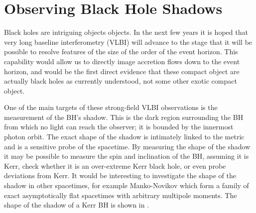 \section{Observing Black Hole Shadows}

Black holes are intriguing objects objects. In the next few years it is hoped that very long baseline interferometry (VLBI) will advance to the stage that it will be possible to resolve features of the size of the order of the event horizon\cite{Doeleman2008}. This capability would allow us to directly image accretion flows down to the event horizon, and would be the first direct evidence that these compact object are actually black holes as currently understood, not some other exotic compact object.

One of the main targets of these strong-field VLBI observations is the measurement of the BH's shadow. This is the dark region surrounding the BH from which no light can reach the observer; it is bounded by the innermost photon orbit\cite{Chandrasekhar1998}. The exact shape of the shadow is intimately linked to the metric and is a sensitive probe of the spacetime. By measuring the shape of the shadow it may be possible to measure the spin and inclination of the BH\cite{Hioki2009a}, assuming it is Kerr, check whether it is an over-extreme Kerr black hole\cite{Bambi2009}, or even probe deviations from Kerr\cite{Johannsen2010a, Johannsen2010b}. It would be interesting to investigate the shape of the shadow in other spacetimes, for example Manko-Novikov\cite{Manko1992, Gair2008a} which form a family of exact asymptotically flat spacetimes with arbitrary multipole moments. The shape of the shadow of a Kerr BH is shown in .
